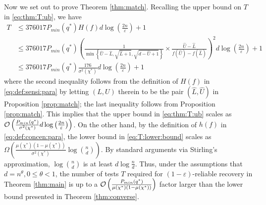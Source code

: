 \documentclass[onecolumn,letterpaper]{IEEEtran}
\newcommand{\cO}{{\cal O}}
\newcommand{\cp}{{q}}
\newcommand{\cpn}{{\cp^*}}
\newcommand{\pminn}{{P_{min}(\cpn)}}
\newcommand{\up}{{U}}
\newcommand{\lw}{{L}}
\newcommand{\plsize}{{\chi}}
\newcommand{\mean}{{\mu}}
\newcommand{\var}{{\sigma^{2}}}
\newcommand{\lwm}{{\hat{L}}}
\newcommand{\upm}{{\hat{U}}}
\newcommand{\fh}{{h(f)}}
\newcommand{\fH}{{H(f)}}
\newcommand{\bet}{{\beta}}
\begin{document}
Now we set out to prove Theorem \ref{thm:match}. Recalling the upper bound on $T$ in \eqref{eq:thm:T:ub}, we have
\begin{align*}
     T &\leq 376017  \pminn  \fH d\log \left( \frac{2n}{\varepsilon } \right)+1 \\
       &\leq  376017  \pminn \left(\frac{1}{\min\left\{\upm-\lwm , \sqrt{\lwm+1} , \sqrt{d-\upm+1}\right\}}\times \frac{\upm-\lwm}{f(\upm)-f(\lwm)} \right)^2 d\log \left( \frac{2n}{\varepsilon } \right)+1\\
       &\leq  376017  \pminn \frac{176}{\var(\plsize^*)} d\log \left( \frac{2n}{\varepsilon } \right)+1
\end{align*}
where the second inequality follows from the definition of $\fH$ in \eqref{eq:def:sensi:para} by letting $(\lw,\up)$ therein to be the pair $(\lwm,\upm)$ in Proposition \ref{prop:match}; the last inequality follows from Proposition \ref{prop:match}. This implies that the upper bound in \eqref{eq:thm:T:ub} scales as 
$\cO \left( \frac{\pminn}{\var(\plsize^*)} d \log \left( \frac{2n}{\varepsilon} \right) \right)$.
On the other hand, by the definition of $\fh$ in \eqref{eq:def:concen:para}, the lower bound in \eqref{eq:T:lower:bound} scales as $\Omega\left(\frac{\mean(\plsize^*)\left(1-\mean(\plsize^*)\right)}{\var(\plsize^*)}\log \binom{n}{d}\right)$. By standard arguments via Stirling’s approximation, $\log \binom{n}{d}$ is at least $d \log \frac n d$. Thus, under the assumptions that $d=n^\theta, 0\leq\theta< 1$, the number of tests $T$ required for $(1-\varepsilon)$-reliable recovery in Theorem \ref{thm:main} is up to a $\cO\left( \frac{\pminn}{\mean(\plsize^{*}) \left( 1-\mean(\plsize^{*}) \right)} \right)$ factor larger than the lower bound presented in Theorem \ref{thm:converse}. 
\end{document}
